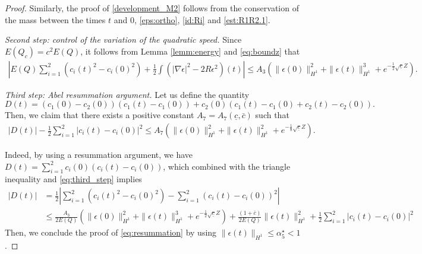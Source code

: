 \documentclass[reqno,10pt]{amsart}
\numberwithin{equation}{section}
\begin{document}
\begin{proof}
        Similarly, the proof of \eqref{development_M2} follows from the conservation of the mass between the times $t$ and $0$, \eqref{eps:ortho}, \eqref{id:Ri} and \eqref{est:R1R2.1}. 

\medskip
\noindent \textit{Second step: control of the variation of the quadratic speed.}
 	Since $E(Q_c) = c^2 E(Q)$, it follows from Lemma \ref{lemm:energy} and \eqref{eq:boundz} that 
		\begin{align}\label{eq:third_step}
			\left\vert E(Q) \sum_{i=1}^2 \left( c_i(t)^2 - c_i(0)^2 \right) + \frac12 \int \left( \vert \nabla \epsilon \vert^2 - 2 R \epsilon^2 \right)(t) \right\vert \leq A_3 \left( \| \epsilon (0) \|_{H^1}^2 + \| \epsilon (t) \|_{H^1}^3 + e^{- \frac12 \sqrt{\underline{c}}Z} \right).
		\end{align}


\medskip
\noindent	\textit{Third step: Abel resummation argument.} Let us define the quantity
\begin{equation} \label{defi:D}
D(t)=(c_1(0) - c_2(0)) \left( c_1(t) - c_1(0) \right) + c_2(0) \left( c_1(t) -c_1(0) + c_2(t) - c_2(0)  \right).
\end{equation}
Then, we claim that there exists a positive constant $A_7=A_7(\underline{c}, \bar{c})$ such that
\begin{align}
	\left\vert D(t)  \right\vert - \frac12 \sum_{i=1}^2 \vert c_i(t) - c_i(0) \vert^2 \le A_7 \left( \| \epsilon(0) \|_{H^1}^2 +\| \epsilon (t) \|_{H^1}^2 + e^{-\frac18 \sqrt{\underline{c} }Z} \right) .\label{eq:resummation}
\end{align}

Indeed, by using a resummation argument, we have
			$D(t)=\sum_{i=1}^2 c_i(0) \left( c_i(t) -c_i(0) \right)$,
which combined with the triangle inequality and \eqref{eq:third_step} implies
\begin{align}
	\left\vert D(t) \right\vert
	& = \frac12 \left\vert \sum_{i=1}^2 \left( c_i(t)^2 - c_i(0)^2 \right) -\sum_{i=1}^2(c_i(t) -c_i(0))^2 \right\vert \label{eq:Abel}\\
	& \leq \frac{A_3}{2 E(Q)} \left( \| \epsilon (0) \|_{H^1}^2 + \| \epsilon(t) \|_{H^1}^3 + e^{-\frac12 \sqrt{\underline{c}} Z}\right) +\frac{(1+\bar{c})}{2E(Q)} \| \epsilon (t) \|_{H^1}^2 + \frac12 \sum_{i=1}^2 \vert c_i(t) - c_i(0) \vert^2 \nonumber
\end{align}
Then, we conclude the proof of \eqref{eq:resummation} by using $\| \epsilon (t) \|_{H^1} \leq \alpha_5^\star<1$.


\end{proof}
\end{document}
